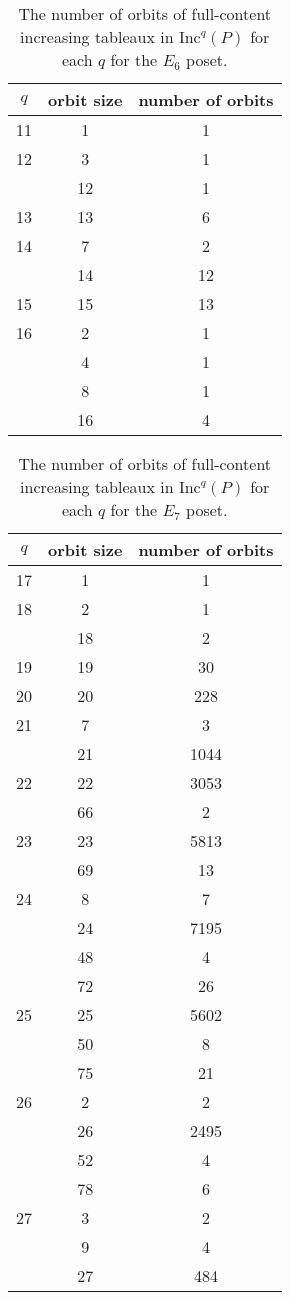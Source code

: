 \documentclass[12pt]{amsart}
\theoremstyle{definition}
\theoremstyle{remark}
\numberwithin{equation}{section}
\newcommand{\inc}{\ensuremath{\mathrm{Inc}}}
\begin{document}
\begin{table}
\begin{tabular}{|c|c|c|}
\hline
$q$ & orbit size & number of orbits\\
  \hline
  11 & 1 & 1\\
  \hline
  12 & 3 & 1\\ \cline{2-3}
   & 12 & 1 \\
   \hline
  13 & 13 & 6\\
  \hline
  14 & 7 & 2\\\cline{2-3}
  & 14 & 12\\
  \hline
    15 & 15 & 13\\
  \hline
  16 & 2 & 1\\\cline{2-3}
   & 4 & 1\\\cline{2-3}
   & 8 & 1\\\cline{2-3}
  & 16 & 4\\
  \hline
\end{tabular}
\caption{The number of orbits of full-content increasing tableaux in $\inc^q(P)$ for each $q$ for the $E_6$ poset.}
\label{tab:E6}
\end{table}

\begin{table}
\begin{tabular}{|c|c|c|}
\hline
$q$ & orbit size & number of orbits\\
  \hline
  17 & 1 & 1\\
  \hline
  18 & 2 & 1\\ \cline{2-3}
   & 18 & 2 \\
   \hline
  19 & 19 & 30\\
  \hline
  20 & 20 & 228\\
  \hline
    21 & 7 & 3\\ \cline{2-3}
    & 21 & 1044 \\
  \hline
  22 & 22 & 3053\\\cline{2-3}
   & 66 & 2\\
  \hline
  23 & 23 & 5813\\ \cline{2-3}
  & 69 & 13 \\
   \hline
  24 & 8 & 7\\\cline{2-3}
   & 24 & 7195\\\cline{2-3}
   & 48 & 4\\\cline{2-3}
   & 72 & 26\\
   \hline
  25 & 25 & 5602\\ \cline{2-3}
  & 50 & 8 \\ \cline{2-3}
  & 75 & 21 \\
   \hline
  26 & 2 & 2\\ \cline{2-3}
  & 26 & 2495 \\ \cline{2-3}
  & 52 & 4 \\ \cline{2-3}
  & 78 & 6 \\
   \hline
 27 & 3 & 2\\ \cline{2-3}
  & 9 & 4 \\ \cline{2-3}
  & 27 & 484 \\
  \hline
\end{tabular}
\caption{The number of orbits of full-content increasing tableaux in $\inc^q(P)$ for each $q$ for the $E_7$ poset.}
\label{tab:E7}
\end{table}
\end{document}
